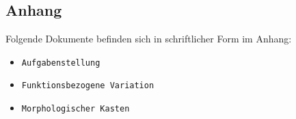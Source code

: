 \newpage
\begin{appendix}
\section{Anhang}
Folgende Dokumente befinden sich in schriftlicher Form im Anhang:

\begin{itemize}
	\item \verb|Aufgabenstellung|
	\item \verb|Funktionsbezogene Variation|
	\item \verb|Morphologischer Kasten|	
	
\end{itemize}





\end{appendix}